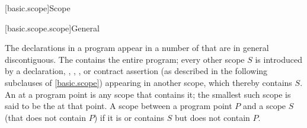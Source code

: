 [basic.scope]{Scope}%

[basic.scope.scope]{General}

\pnum
The declarations in a program appear in a number of 
that are in general discontiguous.
The  contains the entire program;
every other scope $S$ is introduced by a
declaration,
,
,
, or
contract assertion
(as described in the following subclauses of \ref{basic.scope})
appearing in another scope, which thereby contains $S$.
An  at a program point is any scope that contains it;
the smallest such scope is said to be the 
at that point.
A scope 
between a program point $P$ and a scope $S$
(that does not contain $P$) if it is or contains $S$ but does not contain $P$.

